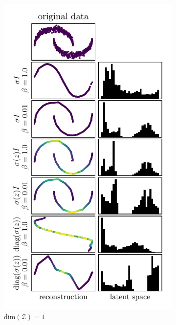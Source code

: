 \begin{figure}
\centering
    \begin{subfigure}[b]{0.45\textwidth}
        \centering
        \includegraphics[scale=0.9]{data/chapter_survey/vae_two_moons_z1_colored}
        \caption{$\text{dim}(\mathcal{Z})=1$}
    \end{subfigure}
    \begin{subfigure}[b]{0.45\textwidth}
        \centering

\end{subfigure}
\end{figure}
